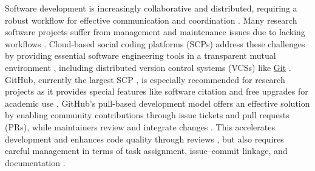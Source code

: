 \documentclass{article}
\begin{document}
Software development is increasingly collaborative and distributed, requiring a robust workflow for effective communication and coordination \cite{ScaleAndEvolOfCoordNeeds, GlobalSoftEng, InfluenceOfSocialAndTechnicalFactors, UnderstandingCommunitySmells, GlobalSoftDevChallenges, ConfigManageForLargescaleSciComp, CollabSoftEngBookConcepts, StateOfArtInEndUserSoftEng}. Many research software projects suffer from management and maintenance issues due to lacking workflows \cite{ProblemsOfEndUserDevs, DevelopingSciSoft, SurveySEPracticesInScience, NamingThePainInDevSciSoft, ConfigManageForLargescaleSciComp}. Cloud-based social coding platforms (SCPs) address these challenges by providing essential software engineering tools in a transparent mutual environment \cite{OpenSourceSoftHostingPlatforms, CharacterizingProjEvolOnSocialCodingPlat, SocialCodingInGitHub}, including distributed version control systems (VCSs) like \href{https://git-scm.com/}{Git} \cite{VCSReview}. GitHub, currently the largest SCP \cite{GitHubOctoverse2024}, is especially recommended for research projects \cite{10RuleForSoftwareInCompBio, BestPracticesForSciComp, 10SimpleRulesGitAndGitHub} as it provides special features like software citation and free upgrades for academic use \cite{GitHubForScience}. GitHub's pull-based development model offers an effective solution by enabling community contributions through issue tickets and pull requests (PRs), while maintainers review and integrate changes \cite{ExplorStudyPullBased, WorkPractPullBased, CharacterizingProjEvolOnSocialCodingPlat}. 
This accelerates development and enhances code quality through reviews \cite{5RecommendedPracticesForCompSci, 10MetricsForSciSoftware, BestPracticesForSciComp}, but also requires careful management in terms of task assignment, issue–commit linkage, and documentation \cite{WhatMakesCompSoftSuccessful, DealingWithRiskInSciSoft, 5RecommendedPracticesForCompSci, CharacterizingProjEvolOnSocialCodingPlat, SciSoftDevIsNotOxymoron, 4SimpleRecs, SustainableResearchSoftwareHandOver, ConfigManageForLargescaleSciComp}.
\end{document}
